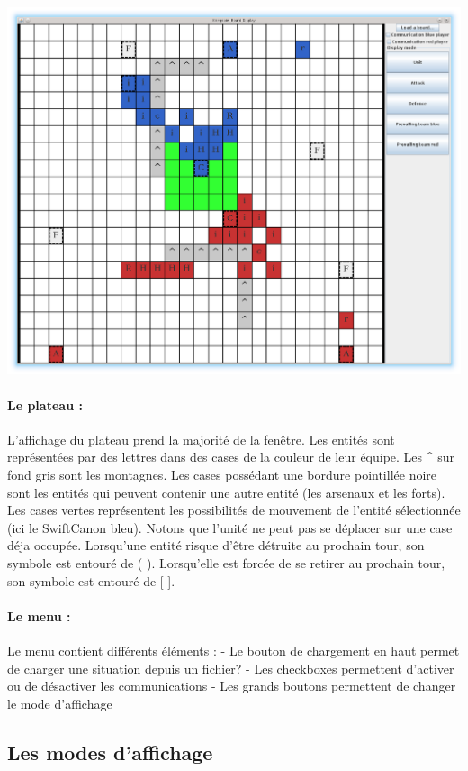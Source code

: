 \documentclass[12pt]{article}
\begin{document}
			\includegraphics[scale=0.4]{images/screen1.eps}
			\paragraph{Le plateau :}
			L'affichage du plateau prend la majorité de la fenêtre.
			Les entités sont représentées par des lettres dans des cases de la couleur de leur équipe.
			Les \^{} sur fond gris sont les montagnes.
			Les cases possédant une bordure pointillée noire sont les entités qui peuvent contenir une autre entité	(les arsenaux et les forts).
			Les cases vertes représentent les possibilités de mouvement	de l'entité sélectionnée (ici le SwiftCanon bleu). 
			Notons que l'unité ne peut pas se déplacer sur une case déja occupée.
			Lorsqu'une entité risque d'être détruite au prochain tour, son symbole est entouré de ( ).
			Lorsqu'elle est forcée de se retirer au prochain tour, son symbole est entouré de [ ].
		
			\paragraph{Le menu :}
		
			Le menu contient différents éléments :
			- Le bouton de chargement en haut permet de charger une situation depuis un fichier?
			- Les checkboxes permettent d'activer ou de désactiver les communications
			- Les grands boutons permettent de changer le mode d'affichage

		\subsection{ Les modes d'affichage}
\end{document}
